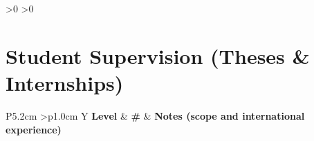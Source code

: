 %
%
\ifnum\cvSupervisionCount>0
\ifnum\cvSupervisionPrinted>0
\section{\textbf{Student Supervision (Theses \& Internships)}}
\vspace{-0.4mm}

\small{
\cvSupervisionNote
}

\vspace{1.5mm}

\begin{cvtable}{P{5.2cm} >{\centering\arraybackslash}p{1.0cm} Y}
\toprule
\textbf{Level} & \textbf{\#} & \textbf{Notes (scope and international experience)} \\
\midrule
\cvSupervisionRows
\bottomrule
\end{cvtable}
\fi
\fi

